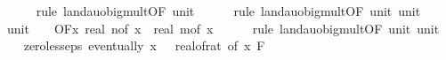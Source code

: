\begin{isabellebody}
\ \ \ \ \isamarkupfalse%
\ {\isacharparenleft}{\kern0pt}rule\ landau{\isacharunderscore}{\kern0pt}o{\isachardot}{\kern0pt}big{\isacharunderscore}{\kern0pt}mult{\isacharunderscore}{\kern0pt}{}{\isacharbrackleft}{\kern0pt}OF\ unit{\isacharunderscore}{\kern0pt}{}{\isacharbrackright}{\kern0pt}{\isacharparenright}{\kern0pt}\isanewline
\ \ \ \ \isamarkupfalse%
\ {\isacharparenleft}{\kern0pt}rule\ landau{\isacharunderscore}{\kern0pt}o{\isachardot}{\kern0pt}big{\isacharunderscore}{\kern0pt}mult{\isacharunderscore}{\kern0pt}{}{\isacharbrackleft}{\kern0pt}OF\ unit{\isacharunderscore}{\kern0pt}{}\ unit{\isacharunderscore}{\kern0pt}{}{\isacharbrackright}{\kern0pt}{\isacharparenright}{\kern0pt}\ \isanewline
\isanewline
\ \ \isamarkupfalse%
\ unit{\isacharunderscore}{\kern0pt}{}{\isacharcolon}{\kern0pt}\ {\isachardoublequoteopen}{\isacharparenleft}{\kern0pt}{\isasymlambda}{\isacharunderscore}{\kern0pt}{\isachardot}{\kern0pt}\ {}{\isacharparenright}{\kern0pt}\ {\isasymin}\ O{\isacharbrackleft}{\kern0pt}{\isacharquery}{\kern0pt}F{\isacharbrackright}{\kern0pt}{\isacharparenleft}{\kern0pt}{\isasymlambda}x{\isachardot}{\kern0pt}\ real\ {\isacharparenleft}{\kern0pt}n{\isacharunderscore}{\kern0pt}of\ x{\isacharparenright}{\kern0pt}\ {\isacharasterisk}{\kern0pt}\ real\ {\isacharparenleft}{\kern0pt}m{\isacharunderscore}{\kern0pt}of\ x{\isacharparenright}{\kern0pt}{\isacharparenright}{\kern0pt}{\isachardoublequoteclose}\isanewline
\ \ \ \ \isamarkupfalse%
\ {\isacharparenleft}{\kern0pt}rule\ landau{\isacharunderscore}{\kern0pt}o{\isachardot}{\kern0pt}big{\isacharunderscore}{\kern0pt}mult{\isacharunderscore}{\kern0pt}{}{\isacharprime}{\kern0pt}{\isacharbrackleft}{\kern0pt}OF\ unit{\isacharunderscore}{\kern0pt}{}\ unit{\isacharunderscore}{\kern0pt}{}{\isacharbrackright}{\kern0pt}{\isacharparenright}{\kern0pt}\isanewline
\isanewline
\ \ \isamarkupfalse%
\ zero{\isacharunderscore}{\kern0pt}less{\isacharunderscore}{\kern0pt}eps{\isacharcolon}{\kern0pt}\ {\isachardoublequoteopen}eventually\ {\isacharparenleft}{\kern0pt}{\isasymlambda}x{\isachardot}{\kern0pt}\ {}\ {\isacharless}{\kern0pt}\ {\isacharparenleft}{\kern0pt}real{\isacharunderscore}{\kern0pt}of{\isacharunderscore}{\kern0pt}rat\ {\isacharparenleft}{\kern0pt}{\isasymepsilon}{\isacharunderscore}{\kern0pt}of\ x{\isacharparenright}{\kern0pt}{\isacharparenright}{\kern0pt}{\isacharparenright}{\kern0pt}\ {\isacharquery}{\kern0pt}F{\isachardoublequoteclose}\isanewline

\end{isabellebody}
